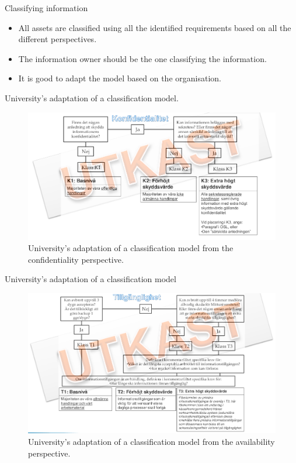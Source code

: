 \documentclass{beamer}
\begin{document}
\begin{frame}{Classifying information}
  \begin{itemize}
    \item All assets are classified using all the identified requirements based
      on all the different perspectives.
    \item The information owner should be the one classifying the information.
    \item It is good to adapt the model based on the organisation.
  \end{itemize}
\end{frame}

\begin{frame}{University's adaptation of a classification model.}
  \begin{figure}
    \includegraphics[width=\textwidth]{miun-klassificering.png}
    \caption{University's adaptation of a classification model from the
      confidentiality perspective.}
  \end{figure}
\end{frame}

\begin{frame}{University's adaptation of a classification model}
  \begin{figure}
    \includegraphics[width=\textwidth]{miun-tillganglighet.png}
    \caption{University's adaptation of a classification model from the
      availability perspective.}
  \end{figure}
\end{frame}
\end{document}
